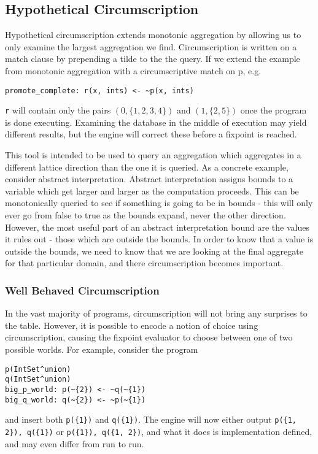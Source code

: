 \subsection{Hypothetical Circumscription}
\label{sec:inf-circ}
Hypothetical circumscription extends monotonic aggregation by allowing us to only examine the largest aggregation we find.
Circumscription is written on a match clause by prepending a tilde to the the query.
If we extend the example from monotonic aggregation with a circumscriptive match on p, e.g.
\begin{verbatim}
promote_complete: r(x, ints) <- ~p(x, ints)
\end{verbatim}
\texttt{r} will contain only the pairs $(0, \{1, 2, 3, 4\})$ and $(1, \{2, 5\})$ once the program is done executing.
Examining the database in the middle of execution may yield different results, but the engine will correct these before a fixpoint is reached.

This tool is intended to be used to query an aggregation which aggregates in a different lattice direction than the one it is queried.
As a concrete example, consider abstract interpretation.
Abstract interpretation assigns bounds to a variable which get larger and larger as the computation proceeds.
This can be monotonically queried to see if something is going to be in bounds - this will only ever go from false to true as the bounds expand, never the other direction.
However, the most useful part of an abstract interpretation bound are the values it rules out - those which are outside the bounds.
In order to know that a value is outside the bounds, we need to know that we are looking at the final aggregate for that particular domain, and there circumscription becomes important.

\subsubsection{Well Behaved Circumscription}
In the vast majority of programs, circumscription will not bring any surprises to the table.
However, it is possible to encode a notion of choice using circumscription, causing the fixpoint evaluator to choose between one of two possible worlds.
For example, consider the program
\begin{verbatim}
p(IntSet^union)
q(IntSet^union)
big_p_world: p(~{2}) <- ~q(~{1})
big_q_world: q(~{2}) <- ~p(~{1})
\end{verbatim}
and insert both \texttt{p(\{1\})} and \texttt{q(\{1\})}.
The engine will now either output \texttt{p(\{1, 2\}), q(\{1\})} or \texttt{p(\{1\}), q(\{1, 2\})}, and what it does is implementation defined, and may even differ from run to run.

